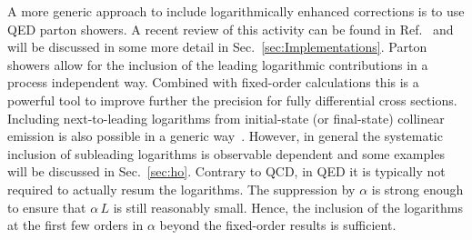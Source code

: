 A more generic approach to include logarithmically enhanced
corrections is to use QED parton showers. A recent review of this
activity can be found in Ref.~\cite{Frixione:2022ofv} and will be discussed
in some more detail in Sec.~\ref{sec:Implementations}.  Parton
showers allow for the inclusion of the leading logarithmic
contributions in a process independent way. Combined with fixed-order
calculations this is a powerful tool to improve further the precision
for fully differential cross sections. Including next-to-leading
logarithms from initial-state (or final-state) collinear emission is also possible in
a generic way~\cite{Bertone:2019hks}. However, in general the
systematic inclusion of subleading logarithms is observable dependent
and some examples will be discussed in Sec.~\ref{sec:ho}. Contrary
to QCD, in QED it is typically not required to actually resum the
logarithms. The suppression by $\alpha$ is strong enough to ensure
that $\alpha\,L$ is still reasonably small. Hence, the inclusion of
the logarithms at the first few orders in $\alpha$ beyond the
fixed-order results is sufficient.


